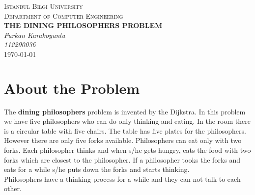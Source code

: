 \documentclass[12pt,a4paper]{report}
\begin{document}
\begin{titlepage}
 \vspace*{2cm}
 \centering
 {\scshape\LARGE Istanbul Bilgi University\\}
 \vspace{1cm}
 {\scshape\Large Department of Computer Engineering\\}
 \vspace{4cm}
 {\huge\bfseries THE DINING PHILOSOPHERS PROBLEM\\}
 \vspace{3cm}
 {\Large\itshape Furkan Karakoyunlu\\112200036\\}
 \vfill
 \vfill
 {\large \today\\}
\end{titlepage}

\section*{About the Problem}
 \begin{flushleft}
  The \textbf{dining philosophers} problem is invented by the Dijkstra. In this problem we have five philosophers who can do only
  thinking and eating. In the room there is a circular table with five chairs. The table has five plates for the philosophers. 
  However there are only five forks available. Philosophers can eat only with two forks. Each philosopher thinks and when s/he 
  gets hungry, eats the food with two forks which are closest to the philosopher. If a philosopher tooks the forks and eats 
  for a while s/he puts down the forks and starts thinking.\\
  \bigskip
  Philosophers have a thinking process for a while and they can not talk to each other.
 \end{flushleft}
 
\end{document}
